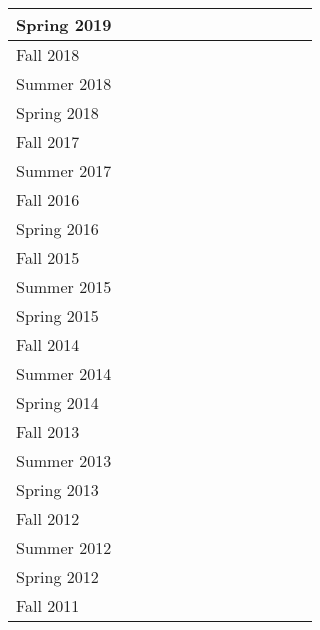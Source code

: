 \documentclass[11pt]{letter}
\newcommand{\ck}{\checkmark}
\begin{document}
\begin{tabular}{|l|c|c|c|c|c|c|c|c|c|c|c|c|}
  Spring 2019 &    &    &    &    &    &\ck &    &    &    &\ck &\ck &    \\ \hline
  Fall   2018 &\ck &    &    &    &\ck &\ck &    &    &    &    &    &    \\ \hline
  Summer 2018 &    &    &    &    &    &\ck &    &    &    &    &    &    \\ \hline
  Spring 2018 &    &    &    &    &    &\ck &    &    &    &\ck &    &    \\ \hline
  Fall   2017 &    &    &    &    &\ck &\ck &    &    &    &    &    &    \\ \hline
  Summer 2017 &    &    &    &    &    &    &    &\ck &    &    &    &    \\ \hline
  Fall   2016 &    &\ck &    &    &    &    &\ck &    &    &    &    &    \\ \hline
  Spring 2016 &    &\ck &    &    &    &    &    &    &    &\ck &    &    \\ \hline
  Fall   2015 &    &\ck &    &    &    &    &\ck &    &    &    &    &    \\ \hline
  Summer 2015 &    &    &    &    &    &\ck &    &    &    &    &    &    \\ \hline
  Spring 2015 &    &    &\ck &    &    &\ck &    &    &    &    &    &    \\ \hline
  Fall   2014 &    &    &    &    &    &\ck &\ck &    &    &    &    &    \\ \hline
  Summer 2014 &    &    &    &    &    &\ck &    &    &    &    &    &    \\ \hline
  Spring 2014 &    &    &    &    &    &\ck &    &    &    &    &    &    \\ \hline
  Fall   2013 &    &\ck &    &    &    &    &    &    &\ck &    &    &    \\ \hline
  Summer 2013 &    &    &    &    &    &\ck &    &    &    &    &    &    \\ \hline
  Spring 2013 &    &\ck &    &    &    &\ck &    &    &    &    &    &    \\ \hline
  Fall   2012 &\ck &    &    &    &    &    &    &    &    &    &    &    \\ \hline
  Summer 2012 &    &    &    &    &    &\ck &    &\ck &    &    &    &    \\ \hline
  Spring 2012 &\ck &    &    &    &    &\ck &\ck &    &    &    &    &    \\ \hline
  Fall   2011 &\ck &    &    &    &    &    &    &    &    &    &    &\ck \\ \hline

\end{tabular}
\end{document}
